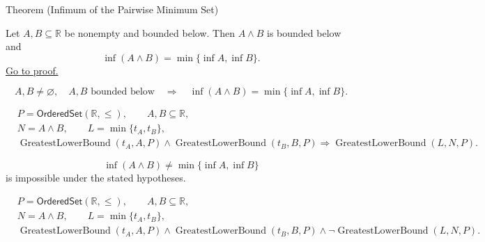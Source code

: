 \begin{theorembox}{Theorem (Infimum of the Pairwise Minimum Set)}
\begin{theorem}
\label{thm:infimum-pairwise-minimum-set}
Let $A,B\subseteq\mathbb{R}$ be nonempty and bounded below. Then $A\wedge B$
is bounded below and
\[
\inf(A\wedge B)=\min\{\inf A,\inf B\}.
\]
\hyperref[prf:infimum-pairwise-minimum-set]{Go to proof.}
\end{theorem}
\end{theorembox}

\begin{remark*}
\[
A,B\neq\varnothing,\quad A,B\text{ bounded below}
\quad\Longrightarrow\quad
\inf(A\wedge B)=\min\{\inf A,\inf B\}.
\]
\end{remark*}

\begin{remark*}
\[
\begin{aligned}
&P=\mathsf{OrderedSet}(\mathbb{R},\leq),\qquad A,B\subseteq\mathbb{R},\\
&N=A\wedge B,\qquad L=\min\{t_A,t_B\},\\
&\operatorname{GreatestLowerBound}(t_A,A,P)\land\operatorname{GreatestLowerBound}(t_B,B,P)
\Longrightarrow
\operatorname{GreatestLowerBound}(L,N,P).
\end{aligned}
\]
\end{remark*}

\begin{remark*}
\[
\inf(A\wedge B)\neq\min\{\inf A,\inf B\}
\]
is impossible under the stated hypotheses.
\end{remark*}

\begin{remark*}
\[
\begin{aligned}
&P=\mathsf{OrderedSet}(\mathbb{R},\leq),\qquad A,B\subseteq\mathbb{R},\\
&N=A\wedge B,\qquad L=\min\{t_A,t_B\},\\
&\operatorname{GreatestLowerBound}(t_A,A,P)\land\operatorname{GreatestLowerBound}(t_B,B,P)\land
\neg\operatorname{GreatestLowerBound}(L,N,P).
\end{aligned}
\]
\end{remark*}

